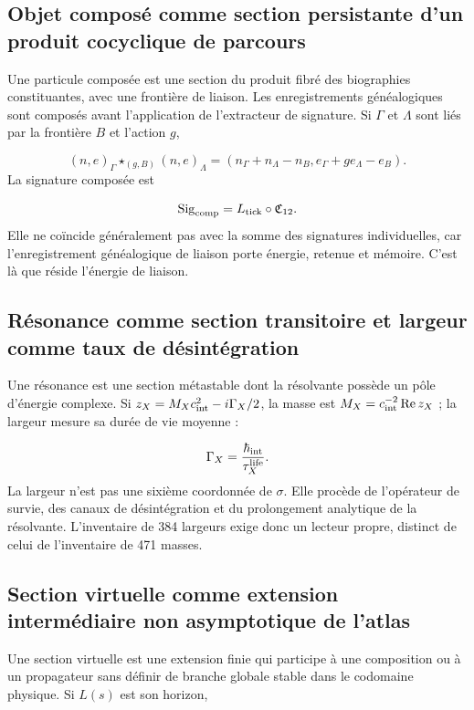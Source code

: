 
\subsection{Objet composé comme section persistante d'un produit cocyclique de parcours}
Une particule composée est une section du produit fibré des biographies constituantes, avec une frontière de liaison. Les enregistrements généalogiques sont composés avant l'application de l'extracteur de signature. Si \(\Gamma\) et \(\Lambda\) sont liés par la frontière \(B\) et l'action \(g\),

\[
(n,e)_\Gamma\star_{(g,B)}(n,e)_\Lambda
=
(n_\Gamma+n_\Lambda-n_B,
e_\Gamma+ge_\Lambda-e_B).
\]
La signature composée est

\[
\operatorname{Sig}_{\rm comp}
=L_{\rm tick}\circ\mathfrak C_{12}.
\]
Elle ne coïncide généralement pas avec la somme des signatures individuelles, car l'enregistrement généalogique de liaison porte énergie, retenue et mémoire. C'est là que réside l'énergie de liaison.

\subsection{Résonance comme section transitoire et largeur comme taux de désintégration}
Une résonance est une section métastable dont la résolvante possède un pôle d'énergie complexe. Si \(z_X=M_Xc_{\rm int}^{2}-i\Gamma_X/2\), la masse est \(M_X=c_{\rm int}^{-2}\operatorname{Re}z_X\) ; la largeur mesure sa durée de vie moyenne :

\[
\Gamma_X=\frac{\hbar_{\rm int}}{\tau_X^{\rm life}}.
\]
La largeur n'est pas une sixième coordonnée de \(\sigma\). Elle procède de l'opérateur de survie, des canaux de désintégration et du prolongement analytique de la résolvante. L'inventaire de 384 largeurs exige donc un lecteur propre, distinct de celui de l'inventaire de 471 masses.

\subsection{Section virtuelle comme extension intermédiaire non asymptotique de l'atlas}
Une section virtuelle est une extension finie qui participe à une composition ou à un propagateur sans définir de branche globale stable dans le codomaine physique. Si \(L(s)\) est son horizon,

